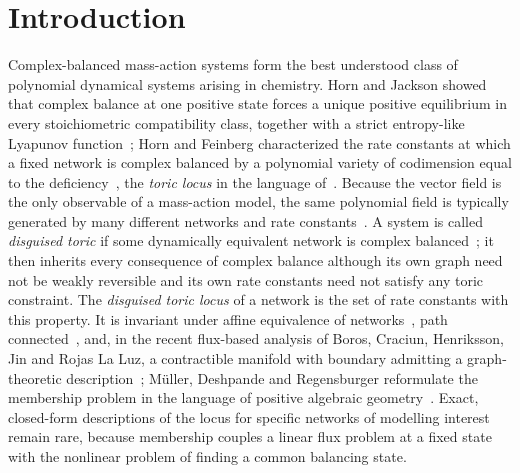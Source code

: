 \documentclass[11pt,a4paper]{article}
\theoremstyle{plain}
\theoremstyle{definition}
\theoremstyle{remark}
\begin{document}
\section{Introduction}\label{sec:intro}

Complex-balanced mass-action systems form the best understood class of polynomial dynamical systems arising in chemistry. Horn and Jackson showed that complex balance at one positive state forces a unique positive equilibrium in every stoichiometric compatibility class, together with a strict entropy-like Lyapunov function~\cite{HornJackson1972}; Horn and Feinberg characterized the rate constants at which a fixed network is complex balanced by a polynomial variety of codimension equal to the deficiency~\cite{Horn1972,Feinberg1972,Feinberg2019}, the \emph{toric locus} in the language of~\cite{CDSS2009}. Because the vector field is the only observable of a mass-action model, the same polynomial field is typically generated by many different networks and rate constants~\cite{CraciunPantea2008,Szederkenyi2010,JohnstonSiegel2011}. A system is called \emph{disguised toric} if some dynamically equivalent network is complex balanced~\cite{BrustengaCraciunSorea2022}; it then inherits every consequence of complex balance although its own graph need not be weakly reversible and its own rate constants need not satisfy any toric constraint. The \emph{disguised toric locus} of a network is the set of rate constants with this property. It is invariant under affine equivalence of networks~\cite{HaqueSatrianoSoreaYu2023}, path connected~\cite{CraciunDeshpandeJin2024}, and, in the recent flux-based analysis of Boros, Craciun, Henriksson, Jin and Rojas La Luz, a contractible manifold with boundary admitting a graph-theoretic description~\cite{Boros2026}; M\"uller, Deshpande and Regensburger reformulate the membership problem in the language of positive algebraic geometry~\cite{MullerDeshpandeRegensburger2026}. Exact, closed-form descriptions of the locus for specific networks of modelling interest remain rare, because membership couples a linear flux problem at a fixed state with the nonlinear problem of finding a common balancing state.
\end{document}
